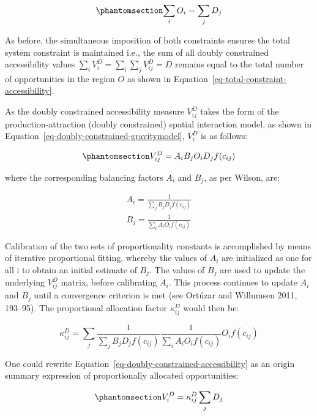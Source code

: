 \documentclass[
]{article}
\begin{document}
\begin{equation}\phantomsection\label{eq-opportunity-population-equality}{
\sum_i O_i = \sum_j D_j
}\end{equation}

As before, the simultaneous imposition of both constraints ensures the
total system constraint is maintained i.e., the sum of all doubly
constrained accessibility values
\(\sum_i V^D_{i} = \sum_i\sum_j  V^D_{ij} = D\) remains equal to the
total number of opportunities in the region \(O\) as shown in
Equation~\ref{eq-total-constraint-accessibility}.

As the doubly constrained accessibility measure \(V_{ij}^D\) takes the
form of the production-attraction (doubly constrained) spatial
interaction model, as shown in
Equation~\ref{eq-doubly-constrained-gravitymodel}, \(V_{i}^D\) is as
follows:

\begin{equation}\phantomsection\label{eq-doubly-constrained-accessibility}{
V_{ij}^D = A_i B_j O_i D_j f(c_{ij})
}\end{equation}

\noindent where the corresponding balancing factors \(A_i\) and \(B_j\),
as per Wilson, are:

\[
\begin{array}{l}
A_i = \frac{1}{\sum_j B_j D_j f(c_{ij})}\\
B_j = \frac{1}{\sum_i A_i O_i f(c_{ij})}
\end{array}
\]

Calibration of the two sets of proportionality constants is accomplished
by means of iterative proportional fitting, whereby the values of
\(A_i\) are initialized as one for all i to obtain an initial estimate
of \(B_j\). The values of \(B_j\) are used to update the underlying
\(V_{ij}^D\) matrix, before calibrating \(A_i\). This process continues
to update \(A_i\) and \(B_j\) until a convergence criterion is met (see
Ortúzar and Willumsen 2011, 193--95). The proportional allocation factor
\(\kappa_{ij}^D\) would then be:

\[
\kappa_{ij}^D = \sum_j \frac{1}{\sum_j B_j D_j f(c_{ij})} \frac{1}{\sum_i A_i O_i f(c_{ij})} O_i f(c_{ij})
\]

One could rewrite Equation~\ref{eq-doubly-constrained-accessibility} as
an origin summary expression of proportionally allocated opportunities:

\begin{equation}\phantomsection\label{eq-doubly-constrained-accessibility-w-paf}{
V^D_{i} = \kappa^D_{ij} \sum_j   D_j
}\end{equation}
\end{document}
